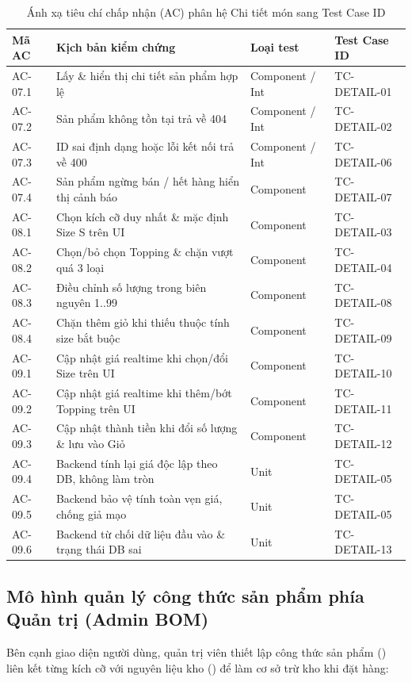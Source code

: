 \begin{table}[H]
\centering\footnotesize
\caption{Ánh xạ tiêu chí chấp nhận (AC) phân hệ Chi tiết món sang Test Case ID}
\label{tab:mapping-ac-detail}
\begin{tabularx}{\textwidth}{@{}p{1.8cm} X p{2.5cm} p{2.8cm}@{}}
\toprule
\textbf{Mã AC} & \textbf{Kịch bản kiểm chứng} & \textbf{Loại test} & \textbf{Test Case ID} \\
\midrule
AC-07.1 & Lấy \& hiển thị chi tiết sản phẩm hợp lệ & Component / Int & TC-DETAIL-01 \\
AC-07.2 & Sản phẩm không tồn tại trả về 404 & Component / Int & TC-DETAIL-02 \\
AC-07.3 & ID sai định dạng hoặc lỗi kết nối trả về 400 & Component / Int & TC-DETAIL-06 \\
AC-07.4 & Sản phẩm ngừng bán / hết hàng hiển thị cảnh báo & Component & TC-DETAIL-07 \\
AC-08.1 & Chọn kích cỡ duy nhất \& mặc định Size S trên UI & Component & TC-DETAIL-03 \\
AC-08.2 & Chọn/bỏ chọn Topping \& chặn vượt quá 3 loại & Component & TC-DETAIL-04 \\
AC-08.3 & Điều chỉnh số lượng trong biên nguyên 1..99 & Component & TC-DETAIL-08 \\
AC-08.4 & Chặn thêm giỏ khi thiếu thuộc tính size bắt buộc & Component & TC-DETAIL-09 \\
AC-09.1 & Cập nhật giá realtime khi chọn/đổi Size trên UI & Component & TC-DETAIL-10 \\
AC-09.2 & Cập nhật giá realtime khi thêm/bớt Topping trên UI & Component & TC-DETAIL-11 \\
AC-09.3 & Cập nhật thành tiền khi đổi số lượng \& lưu vào Giỏ & Component & TC-DETAIL-12 \\
AC-09.4 & Backend tính lại giá độc lập theo DB, không làm tròn & Unit & TC-DETAIL-05 \\
AC-09.5 & Backend bảo vệ tính toàn vẹn giá, chống giả mạo & Unit & TC-DETAIL-05 \\
AC-09.6 & Backend từ chối dữ liệu đầu vào \& trạng thái DB sai & Unit & TC-DETAIL-13 \\
\bottomrule
\end{tabularx}
\end{table}

\subsection{Mô hình quản lý công thức sản phẩm phía Quản trị (Admin BOM)}
Bên cạnh giao diện người dùng, quản trị viên thiết lập công thức sản phẩm () liên kết từng kích cỡ với nguyên liệu kho () để làm cơ sở trừ kho khi đặt hàng:


